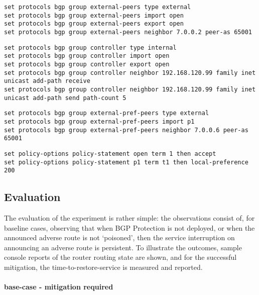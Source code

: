 \begin{lstlisting}[title=default class for external peers]
set protocols bgp group external-peers type external
set protocols bgp group external-peers import open
set protocols bgp group external-peers export open
set protocols bgp group external-peers neighbor 7.0.0.2 peer-as 65001
\end{lstlisting}


\begin{lstlisting}[title=special group for the controller - note the add-path statements]
set protocols bgp group controller type internal
set protocols bgp group controller import open
set protocols bgp group controller export open
set protocols bgp group controller neighbor 192.168.120.99 family inet unicast add-path receive
set protocols bgp group controller neighbor 192.168.120.99 family inet unicast add-path send path-count 5
\end{lstlisting}


\begin{lstlisting}[title=special case external peers\, will get higher local pref and thus may disrupt connectivity]
set protocols bgp group external-pref-peers type external
set protocols bgp group external-pref-peers import p1
set protocols bgp group external-pref-peers neighbor 7.0.0.6 peer-as 65001
\end{lstlisting}


\begin{lstlisting}[title=policy definitions used in earlier clauses.]
set policy-options policy-statement open term 1 then accept
set policy-options policy-statement p1 term t1 then local-preference 200
\end{lstlisting}


\subsection{Evaluation}

The evaluation of the experiment is rather simple: the observations consist of, for baseline cases, observing that when BGP Protection is not deployed, or when the announced adverse route is not `poisoned', then the service interruption on announcing an adverse route is persistent.  To illustrate the outcomes, sample console reports of the router routing state are shown, and for the successful mitigation, the time-to-restore-service is measured and reported.

\paragraph{base-case - mitigation required}

